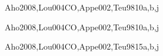 \begin{syllabus}
\begin{unit}{\PLLanguageTranslationandExecution}{}{Aho2008,Lou004CO,Appe002,Teu98}{10}{a,b,j}
\begin{learningoutcomes}
	\item \PLLanguageTranslationandExecutionLODistinguishA [\Assessment]
	\item \PLLanguageTranslationandExecutionLODistinguishSyntax [\Assessment]
	\item \PLLanguageTranslationandExecutionLOSketch [\Assessment]
	\item \PLLanguageTranslationandExecutionLOExplainHowImplementations [\Assessment]
	\item \PLLanguageTranslationandExecutionLOIdentifyAndLeaks [\Assessment]
	\item \PLLanguageTranslationandExecutionLODiscussTheLimitations [\Assessment]
\end{learningoutcomes}
\end{unit}

\begin{unit}{\PLSyntaxAnalysis}{}{Aho2008,Lou004CO,Appe002,Teu98}{10}{a,b,j}
\begin{topics}%
	\item \PLSyntaxAnalysisTopicScanning
	\item \PLSyntaxAnalysisTopicParsing
	\item \PLSyntaxAnalysisTopicGenerating
\end{topics}
\begin{learningoutcomes}
  
	\item \PLSyntaxAnalysisLOUseFormalSpecify [\Assessment]
	\item \PLSyntaxAnalysisLOUseDeclarative [\Assessment]
	\item \PLSyntaxAnalysisLOIdentifyKey [\Assessment]
\end{learningoutcomes}
\end{unit}

\begin{unit}{\PLCompilerSemanticAnalysis}{}{Aho2008,Lou004CO,Appe002,Teu98}{15}{a,b,j}
\begin{topics}%
	\item \PLCompilerSemanticAnalysisTopicHigh
	\item \PLCompilerSemanticAnalysisTopicScope
	\item \PLCompilerSemanticAnalysisTopicType
	\item \PLCompilerSemanticAnalysisTopicDeclarative
\end{topics}
\begin{learningoutcomes}
  
	\item \PLCompilerSemanticAnalysisLOImplementContext [\Assessment]
	\item \PLCompilerSemanticAnalysisLODescribeSemantic [\Assessment]
\end{learningoutcomes}
\end{unit}


\end{syllabus}
